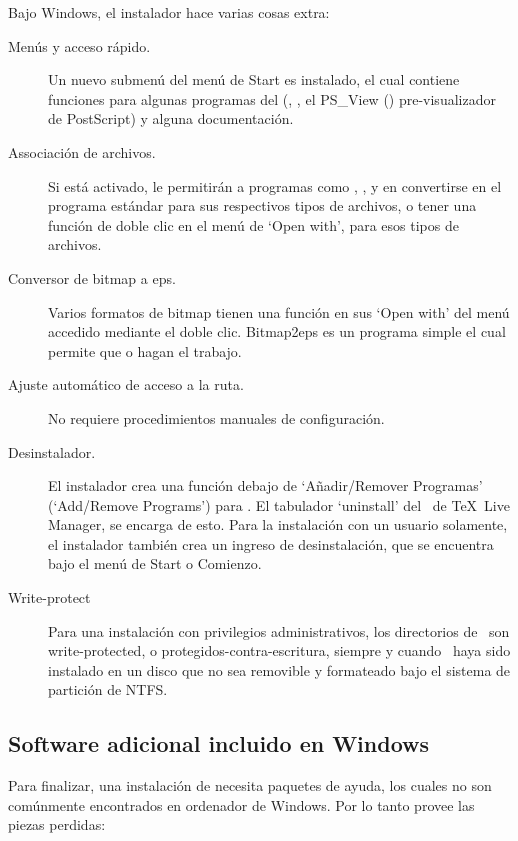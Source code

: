 \documentclass{article}
\begin{document}
Bajo Windows, el instalador hace varias cosas extra:
\begin{description}
\item[Menús y acceso rápido.] Un nuevo submenú del menú de Start es
	instalado, el cual contiene funciones para algunas programas
	del \GUI{} (, , el PS\_View
	() pre-visualizador de PostScript) y alguna
	documentación.
\item [Associación de archivos.] Si está activado, le permitirán a
	programas como , , y
	en convertirse en el programa estándar para sus
	respectivos tipos de archivos, o tener una función de doble
	clic en el menú de `Open with', para esos tipos de archivos.
\item[Conversor de bitmap a eps.] Varios formatos de bitmap tienen una
	función  en sus `Open with' del menú accedido
	mediante el doble clic. Bitmap2eps es un programa simple el
	cual permite que  o  hagan el
	trabajo. 
\item[Ajuste automático de acceso a la ruta.] No requiere
	procedimientos manuales de configuración.
\item[Desinstalador.] El instalador crea una función debajo de
	`Añadir/Remover Programas' (`Add/Remove
		Programs') para \TL. El tabulador `uninstall' del \GUI\ de
	\TeX\ Live Manager, se encarga de esto. Para la
	instalación con un usuario solamente, el instalador
	también crea un ingreso de desinstalación, que se
	encuentra bajo el menú de Start o Comienzo. 
\item[Write-protect] Para una instalación con privilegios
	administrativos, los directorios de \TL\ son
	write-protected, o protegidos-contra-escritura,
	siempre y cuando \TL\ haya sido instalado en un disco
	que no sea removible y formateado bajo el sistema de
	partición de NTFS. 
\end{description}
	
\subsection{Software adicional incluido en Windows}
Para finalizar, una instalación de \TL{} necesita paquetes de ayuda, los cuales no
son comúnmente encontrados en ordenador de Windows. Por lo tanto \TL{} provee las
piezas perdidas:
\end{document}
